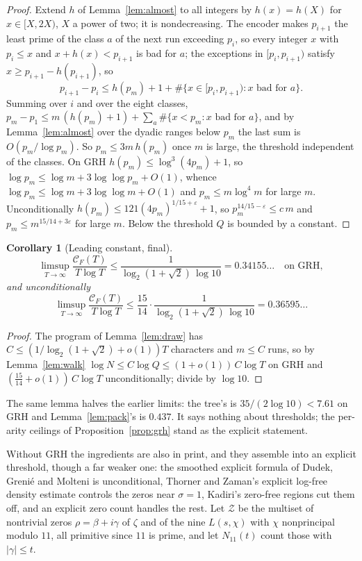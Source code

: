 \documentclass[11pt]{article}
\newtheorem{corollary}[theorem]{Corollary}
\theoremstyle{remark}
\newcommand{\CF}{\mathcal C_F}
\newcommand{\Zeros}{\mathcal Z}
\begin{document}
\begin{proof}
Extend $h$ of Lemma~\ref{lem:almost} to all integers by $h(x)=h(X)$ for
$x\in[X,2X)$, $X$ a power of two; it is nondecreasing.  The encoder makes
$p_{i+1}$ the least prime of the class $a$ of the next run exceeding $p_i$,
so every integer $x$ with $p_i\le x$ and $x+h(x)<p_{i+1}$ is bad for $a$;
the exceptions in $[p_i,p_{i+1})$ satisfy $x\ge p_{i+1}-h(p_{i+1})$, so
\[
  p_{i+1}-p_i\le h(p_m)+1+\#\{x\in[p_i,p_{i+1}):x\text{ bad for }a\}.
\]
Summing over $i$ and over the eight classes,
$p_m-p_1\le m\,(h(p_m)+1)+\sum_a\#\{x<p_m:x\text{ bad for }a\}$, and by
Lemma~\ref{lem:almost} over the dyadic ranges below $p_m$ the last sum is
$O(p_m/\log p_m)$.  So $p_m\le3m\,h(p_m)$ once $m$ is large, the threshold
independent of the classes.  On GRH $h(p_m)\le\log^3(4p_m)+1$, so
$\log p_m\le\log m+3\log\log p_m+O(1)$, whence
$\log p_m\le\log m+3\log\log m+O(1)$ and $p_m\le m\log^4m$ for large $m$.
Unconditionally $h(p_m)\le121(4p_m)^{1/15+\varepsilon}+1$, so
$p_m^{14/15-\varepsilon}\le c\,m$ and $p_m\le m^{15/14+3\varepsilon}$ for
large $m$.  Below the threshold $Q$ is bounded by a constant.
\end{proof}

\begin{corollary}[Leading constant, final]\label{cor:final}
\[
  \limsup_{T\to\infty}\frac{\CF(T)}{T\log T}
  \le\frac{1}{\log_2(1+\sqrt2)\,\log10}=0.34155\ldots\quad\text{on GRH},
\]
and unconditionally
\[
  \limsup_{T\to\infty}\frac{\CF(T)}{T\log T}
  \le\frac{15}{14}\cdot\frac{1}{\log_2(1+\sqrt2)\,\log10}=0.36595\ldots
\]
\end{corollary}

\begin{proof}
The program of Lemma~\ref{lem:draw} has $C\le(1/\log_2(1+\sqrt2)+o(1))T$
characters and $m\le C$ runs, so by Lemma~\ref{lem:walk}
$\log N\le C\log Q\le(1+o(1))\,C\log T$ on GRH and
$(\tfrac{15}{14}+o(1))\,C\log T$ unconditionally; divide by $\log10$.
\end{proof}

The same lemma halves the earlier limits: the tree's is
$35/(2\log10)<7.61$ on GRH and Lemma~\ref{lem:pack}'s is $0.437$.  It
says nothing about thresholds; the per-arity ceilings of
Proposition~\ref{prop:grh} stand as the explicit statement.

Without GRH the ingredients are also in print, and they assemble into an
explicit threshold, though a far weaker one: the smoothed explicit formula
of Dudek, Greni\'e and Molteni is unconditional, Thorner and Zaman's explicit
log-free density estimate controls the zeros near $\sigma=1$, Kadiri's
zero-free regions cut them off, and an explicit zero count handles the rest.
Let $\Zeros$ be the multiset of nontrivial zeros $\rho=\beta+i\gamma$ of
$\zeta$ and of the nine $L(s,\chi)$ with $\chi$ nonprincipal modulo $11$,
all primitive since $11$ is prime, and let $N_{11}(t)$ count those with
$|\gamma|\le t$.
\end{document}
